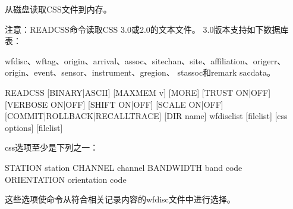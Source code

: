 \label{cmd:readcss}

从磁盘读取CSS文件到内存。

注意：READCSS命令读取CSS 3.0或2.0的文本文件。
3.0版本支持如下数据库表：

wfdisc、wftag、origin、arrival、assoc、sitechan、site、affiliation、origerr、origin、event、sensor、instrument、gregion、
stassoc和remark sacdata。

\begin{SACSTX}
READCSS [BINARY|ASCII] [MAXMEM v] [MORE] [TRUST ON|OFF]
[VERBOSE ON|OFF] [SHIFT ON|OFF] [SCALE ON|OFF] [COMMIT|ROLLBACK|RECALLTRACE] 
[DIR name] wfdisclist [filelist] [css options] [filelist]
\end{SACSTX}

css选项至少是下列之一：

\begin{SACSTX}
STATION station
CHANNEL channel
BANDWIDTH band code
ORIENTATION orientation code
\end{SACSTX}

这些选项使命令从符合相关记录内容的wfdisc文件中进行选择。

